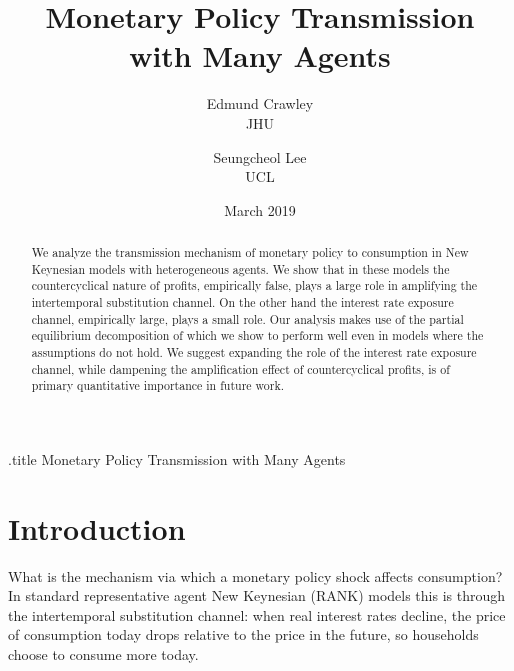 \documentclass[titlepage]{\econtex}\newcommand{\texname}{ConsumptionHeterogeneity}
\begin{document}



\begin{verbatimwrite}{\jobname.title}
Monetary Policy Transmission with Many Agents
\end{verbatimwrite}


\title{ 
	\bigskip
	\bigskip
	Monetary Policy Transmission \\ with Many Agents}

\author{
  Edmund Crawley\authNum   \\ {\small JHU}
  \and
  Seungcheol Lee\authNum    \\ {\small UCL}
}


\keywords{}
\jelclass{}

\date{March 2019}
\maketitle


\begin{abstract}
We analyze the transmission mechanism of monetary policy to consumption in New Keynesian models with heterogeneous agents. We show that in these models the countercyclical nature of profits, empirically false, plays a large role in amplifying the intertemporal substitution channel. On the other hand the interest rate exposure channel, empirically large, plays a small role. Our analysis makes use of the partial equilibrium decomposition of \cite{auclert_monetary_2017} which we show to perform well even in models where the assumptions do not hold. We suggest expanding the role of the interest rate exposure channel, while dampening the amplification effect of countercyclical profits, is of primary quantitative importance in future work.
\end{abstract}


\begin{authorsinfo}
\end{authorsinfo}

\titlepagefinish
\setcounter{page}{1}

\pagebreak
\section{Introduction}
What is the mechanism via which a monetary policy shock affects consumption? In standard representative agent New Keynesian (RANK) models this is through the intertemporal substitution channel: when real interest rates decline, the price of consumption today drops relative to the price in the future, so households choose to consume more today.
\end{document}
